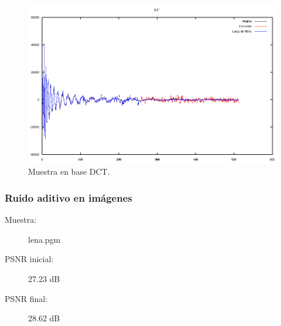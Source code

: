 \documentclass[a4paper,10pt,twoside]{article}
\begin{document}
\begin{figure}[H]
  \centering
  \includegraphics[width=15cm]{graficos/dopp_aditivo_atenuar_dct.png} 
  \caption{Muestra en base DCT.}
\end{figure}


\subsubsection{Ruido aditivo en imágenes}

\begin{description}
  \item[Muestra:] lena.pgm
  \item[PSNR inicial:] 27.23 dB
  \item[PSNR final:] 28.62 dB
\end{description}
\end{document}
